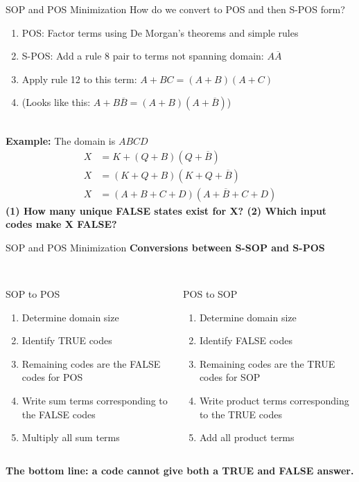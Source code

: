 \documentclass{beamer}
\begin{document}
\begin{frame}{SOP and POS Minimization}
\small
How do we convert to POS and then S-POS form?
\begin{enumerate}
\item POS: Factor terms using De Morgan's theorems and simple rules
\item S-POS: Add a rule 8 pair to terms not spanning domain: $A\overline{A}$
\item Apply rule 12 to this term: $A+BC = (A+B)(A+C)$
\item (Looks like this: $A+B\overline{B} = (A+B)(A+\overline{B})$)
\end{enumerate} \hrulefill \\
\textbf{Example:} The domain is $ABCD$
\begin{align}
X &= K+(Q+B)(Q+\overline{B}) \\
X &= (K+Q+B)(K+Q+\overline{B}) \\
X &= (A+B+C+D)(A+\overline{B}+C+D) \label{eq:S-POS2}
\end{align}
\textbf{(1) How many unique FALSE states exist for X? (2) Which input codes make X FALSE?}
\end{frame}

\begin{frame}{SOP and POS Minimization}
\textbf{Conversions between S-SOP and S-POS} \\ \hrulefill \\
\begin{columns}[T]
\small
\begin{column}{0.5\textwidth}
\centering
SOP to POS
\begin{enumerate}
\item Determine domain size
\item Identify TRUE codes
\item \alert{Remaining codes are the FALSE codes for POS}
\item Write sum terms corresponding to the FALSE codes
\item Multiply all sum terms
\end{enumerate}
\end{column}
\begin{column}{0.5\textwidth}
\centering
POS to SOP
\begin{enumerate}
\item Determine domain size
\item Identify FALSE codes
\item \alert{Remaining codes are the TRUE codes for SOP}
\item Write product terms corresponding to the TRUE codes
\item Add all product terms
\end{enumerate}
\end{column}
\end{columns}
\textbf{The bottom line: a code cannot give both a TRUE and FALSE answer.}
\end{frame}
\end{document}
